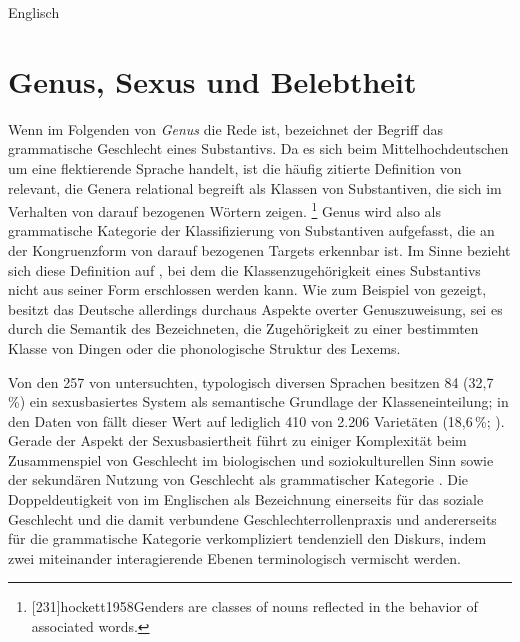 \begin{exe}
\ex\label{ex:engartdiscong}
	Englisch \parencite[nach][70]{kingdalrymple2004}
	\begin{xlist}
		\label{ex:engartdiscong_1}
		\label{ex:engartdiscong_2}
		\label{ex:engartdiscong_3}
		\label{ex:engartdiscong_4}
	\end{xlist}
\end{exe}

\section{Genus, Sexus und Belebtheit}
\label{sec:gendsex}

Wenn im Folgenden von \textit{Genus} die Rede ist, bezeichnet der Begriff das
grammatische Geschlecht eines Substantivs. Da es sich beim Mittelhochdeutschen
um eine flektierende Sprache handelt, ist die häufig zitierte Definition von
\citet[231]{hockett1958} relevant, die Genera relational begreift als Klassen
von Substantiven, die sich im Verhalten von darauf bezogenen Wörtern zeigen.%
%
	\footnote{[231]{hockett1958}{Genders are classes
		of nouns reflected in the behavior of associated words}.}
%
Genus wird also als grammatische Kategorie der Klassifizierung von Substantiven
aufgefasst, die an der Kongruenzform von darauf bezogenen Targets erkennbar
ist. Im Sinne  bezieht sich diese Definition auf
, bei dem die Klassenzugehörigkeit eines Substantivs nicht
aus seiner Form erschlossen werden kann. Wie zum Beispiel von
\citet{koepckezubin2017} gezeigt, besitzt das Deutsche allerdings durchaus
Aspekte overter Genuszuweisung, sei es durch die Semantik des Bezeichneten, die
Zugehörigkeit zu einer bestimmten Klasse von Dingen oder die phonologische
Struktur des Lexems.

Von den 257 von \citet{corbett2013b} untersuchten, typologisch diversen
Sprachen besitzen 84 (32,7\,\%) ein sexusbasiertes System als semantische
Grundlage der Klasseneinteilung; in den Daten von 
\autocite{skirgardetal2023} fällt dieser Wert auf lediglich 410 von 2.206
Varietäten (18,6\,\%; \cite[siehe][]{haynie:gb051}). Gerade der Aspekt der
Sexusbasiertheit führt zu einiger Komplexität beim Zusammenspiel von Geschlecht
im biologischen und soziokulturellen Sinn sowie der sekundären Nutzung von
Geschlecht als grammatischer Kategorie \autocites[dazu
ausführlich][]{kotthoffnuebling2018}{steriopolosteriopolo2022}. Die
Doppeldeutigkeit von  im Englischen als Bezeichnung einerseits für
das soziale Geschlecht und die damit verbundene Geschlechter\-rollen\-praxis
und andererseits für die grammatische Kategorie verkompliziert tendenziell den
Diskurs, indem zwei miteinander interagierende Ebenen terminologisch vermischt
werden.

